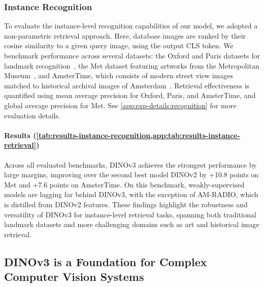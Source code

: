\subsubsection{Instance Recognition}
\label{sec:results-instance-rec}

To evaluate the instance-level recognition capabilities of our model, we adopted a non-parametric retrieval approach. Here, database images are ranked by their cosine similarity to a given query image, using the output CLS token.
We benchmark performance across several datasets: the Oxford and Paris datasets for landmark recognition~\citep{radenovic2018revisiting}, the Met dataset featuring artworks from the Metropolitan Museum~\citep{ypsilantis2021met}, and AmsterTime, which consists of modern street view images matched to historical archival images of Amsterdam~\citep{yildiz2022amstertime}.
Retrieval effectiveness is quantified using mean average precision for Oxford, Paris, and AmsterTime, and global average precision for Met.
See \cref{app:exp-details:recognition} for more evaluation details.

\paragraph[Results]{Results (\cref{tab:results-instance-recognition,app:tab:results-instance-retrieval})}
Across all evaluated benchmarks, DINOv3 achieves the strongest performance by large margins, \eg improving over the second best model DINOv2 by +10.8 points on Met and +7.6 points on AmsterTime.
On this benchmark, weakly-supervised models are lagging far behind DINOv3, with the exception of AM-RADIO, which is distilled from DINOv2 features.
These findings highlight the robustness and versatility of DINOv3 for instance-level retrieval tasks, spanning both traditional landmark datasets and more challenging domains such as art and historical image retrieval.




\subsection{DINOv3 is a Foundation for Complex Computer Vision Systems}
\label{sec:results-system-level}

